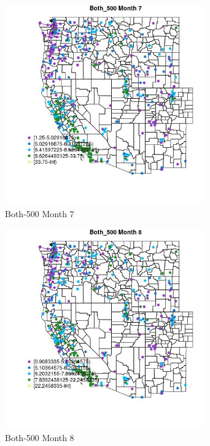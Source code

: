 \begin{figure} 
\centering  
\includegraphics[width=0.77\textwidth]{Code_Outputs/ML_input_report_ML_input_PM25_Step5_part_d_de_duplicated_aves_ML_input_MapObsMo7Both_500.jpg} 
\caption{\label{fig:ML_input_report_ML_input_PM25_Step5_part_d_de_duplicated_aves_ML_inputMapObsMo7Both_500}Both-500 Month 7} 
\end{figure} 
 

\begin{figure} 
\centering  
\includegraphics[width=0.77\textwidth]{Code_Outputs/ML_input_report_ML_input_PM25_Step5_part_d_de_duplicated_aves_ML_input_MapObsMo8Both_500.jpg} 
\caption{\label{fig:ML_input_report_ML_input_PM25_Step5_part_d_de_duplicated_aves_ML_inputMapObsMo8Both_500}Both-500 Month 8} 
\end{figure} 
 

